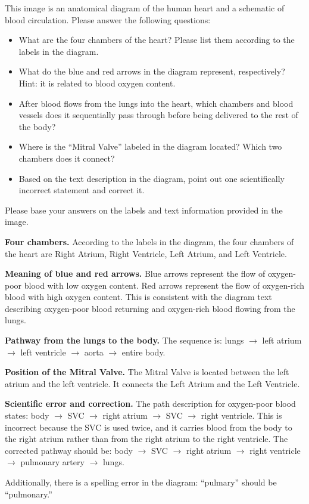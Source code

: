 \documentclass{llmxive}
\begin{document}
\begin{caseprompt}
This image is an anatomical diagram of the human heart and a schematic of blood circulation. Please answer the following questions:
\begin{itemize}[leftmargin=1.6em,itemsep=0.15em,topsep=0.25em]
  \item What are the four chambers of the heart? Please list them according to the labels in the diagram.
  \item What do the blue and red arrows in the diagram represent, respectively? Hint: it is related to blood oxygen content.
  \item After blood flows from the lungs into the heart, which chambers and blood vessels does it sequentially pass through before being delivered to the rest of the body?
  \item Where is the ``Mitral Valve'' labeled in the diagram located? Which two chambers does it connect?
  \item Based on the text description in the diagram, point out one scientifically incorrect statement and correct it.
\end{itemize}
Please base your answers on the labels and text information provided in the image.
\end{caseprompt}

\begin{caseresponse}
\textbf{Four chambers.} According to the labels in the diagram, the four chambers of the heart are Right Atrium, Right Ventricle, Left Atrium, and Left Ventricle.

\textbf{Meaning of blue and red arrows.} Blue arrows represent the flow of oxygen-poor blood with low oxygen content. Red arrows represent the flow of oxygen-rich blood with high oxygen content. This is consistent with the diagram text describing oxygen-poor blood returning and oxygen-rich blood flowing from the lungs.

\textbf{Pathway from the lungs to the body.} The sequence is: lungs \(\rightarrow\) left atrium \(\rightarrow\) left ventricle \(\rightarrow\) aorta \(\rightarrow\) entire body.

\textbf{Position of the Mitral Valve.} The Mitral Valve is located between the left atrium and the left ventricle. It connects the Left Atrium and the Left Ventricle.

\textbf{Scientific error and correction.} The path description for oxygen-poor blood states: body \(\rightarrow\) SVC \(\rightarrow\) right atrium \(\rightarrow\) SVC \(\rightarrow\) right ventricle. This is incorrect because the SVC is used twice, and it carries blood from the body to the right atrium rather than from the right atrium to the right ventricle. The corrected pathway should be: body \(\rightarrow\) SVC \(\rightarrow\) right atrium \(\rightarrow\) right ventricle \(\rightarrow\) pulmonary artery \(\rightarrow\) lungs.

Additionally, there is a spelling error in the diagram: ``pulmary'' should be ``pulmonary.''
\end{caseresponse}
\end{document}
